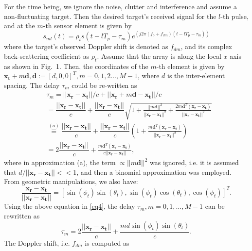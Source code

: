 \documentclass[11pt,draftclsnofoot,onecolumn]{IEEEtran}
\theoremstyle{definition}
\theoremstyle{remark}
\begin{document}
For the time being, we ignore the noise, clutter and interference and assume a non-fluctuating target. Then the desired target's received signal for the $l$-th pulse, and at the $m$-th sensor element is given by
\begin{equation}\label{eq2}
s_{ml}(t)=\rho_t s(t-lT_p-\tau_m)e^{(j2\pi (f_o+f_{dm}) (t-lT_p-\tau_m))}
\end{equation}
where the target's observed Doppler shift is denoted as $f_{dm}$, and its  complex back-scattering coefficient  as  $\rho_t$. Assume that the array is along the local $x$ axis as shown in Fig.~1. Then, the coordinates of the $m$-th element is given by $\mathbf{x_t}+m\mathbf{d},\mathbf{d}:=[d,0,0]^T,m=0,1,2\ldots,M-1$, where $d$ is the inter-element spacing. The delay $\tau_m$ could be re-written as
\small \begin{align}
&\tau_m=||\mathbf{x_r}-\mathbf{x_t}||/c+||\mathbf{x_r}+m\mathbf{d}-\mathbf{x_t}||/c \nonumber \\
       &=\dfrac{||\mathbf{x_r}-\mathbf{x_t}||}{c}+\dfrac{||\mathbf{x_r}-\mathbf{x_t}||}{c} \sqrt{1+\frac{||m\mathbf{d}||^2}{||\mathbf{x_r}-\mathbf{x_t}||^2}+\frac{2m\mathbf{d}^T(\mathbf{x_r}-\mathbf{x_t})}{||\mathbf{x_r}-\mathbf{x_t}||^2}} \nonumber \\
       &\overset{(a)}{\equiv}\dfrac{||\mathbf{x_r}-\mathbf{x_t}||}{c}+\dfrac{||\mathbf{x_r}-\mathbf{x_t}||}{c} \left(1+\frac{m\mathbf{d}^T(\mathbf{x_r}-\mathbf{x_t})}{||\mathbf{x_r}-\mathbf{x_t}||^2} \right) \label{eq3} \\
       &=2\dfrac{||\mathbf{x_r}-\mathbf{x_t}||}{c}+\frac{m\mathbf{d}^T(\mathbf{x_r}-\mathbf{x_t})}{c||\mathbf{x_r}-\mathbf{x_t}||}, \label{eq4}
\end{align}
where in approximation (a), the term $\propto||m\mathbf{d}||^2$ was ignored, i.e. it is assumed that $d/|| \mathbf{x_r}-\mathbf{x_t}||<<1$, and then a binomial approximation was employed. From geometric manipulations, we also have:
\begin{equation*}
\frac{\mathbf{x_r}-\mathbf{x_t}}{||\mathbf{x_r}-\mathbf{x_t}||}=[\sin(\phi_t)\sin(\theta_t),\sin(\phi_t)\cos(\theta_t),\cos(\phi_t)]^T.
\end{equation*}
Using the above equation in \eqref{eq4}, the delay $\tau_m,m=0,1,\ldots,M-1$ can be rewritten as
\begin{equation} \label{eq5}
\tau_m=2\dfrac{||\mathbf{x_r}-\mathbf{x_t}||}{c}+\dfrac{md\sin(\phi_t)\sin(\theta_t)}{c}.
\end{equation}
The Doppler shift, i.e. $f_{dm}$ is computed as
\end{document}
